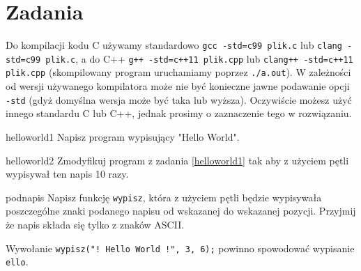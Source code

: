 % 
% 
% 
% 

\section{Zadania}

Do kompilacji kodu C używamy standardowo \Verb#gcc -std=c99 plik.c# lub \Verb#clang -std=c99 plik.c#, a do C++ \Verb#g++ -std=c++11 plik.cpp# lub \Verb#clang++ -std=c++11 plik.cpp# (skompilowany program uruchamiamy poprzez \Verb#./a.out#).
W zależności od wersji używanego kompilatora może nie być konieczne jawne podawanie opcji \Verb#-std# (gdyż domyślna wersja może być taka lub wyższa).
Oczywiście możesz użyć innego standardu C lub C++, jednak prosimy o zaznaczenie tego w rozwiązaniu.
\vspace{3pt}

\begin{Zadanie}{}{helloworld1}
Napisz program wypisujący "Hello World".
\end{Zadanie}

\begin{Zadanie}{}{helloworld2}
Zmodyfikuj program z zadania \ref{helloworld1} tak aby z użyciem pętli wypisywał ten napis 10 razy.
\end{Zadanie}

\begin{Zadanie}{}{podnapis}
Napisz funkcję \Verb#wypisz#, która z użyciem pętli będzie wypisywała poszczególne znaki podanego napisu od wskazanej do wskazanej pozycji. Przyjmij że napis składa się tylko z znaków ASCII.

Wywołanie \Verb#wypisz("! Hello World !", 3, 6);# powinno spowodować wypisanie \Verb#ello#.
\end{Zadanie}


